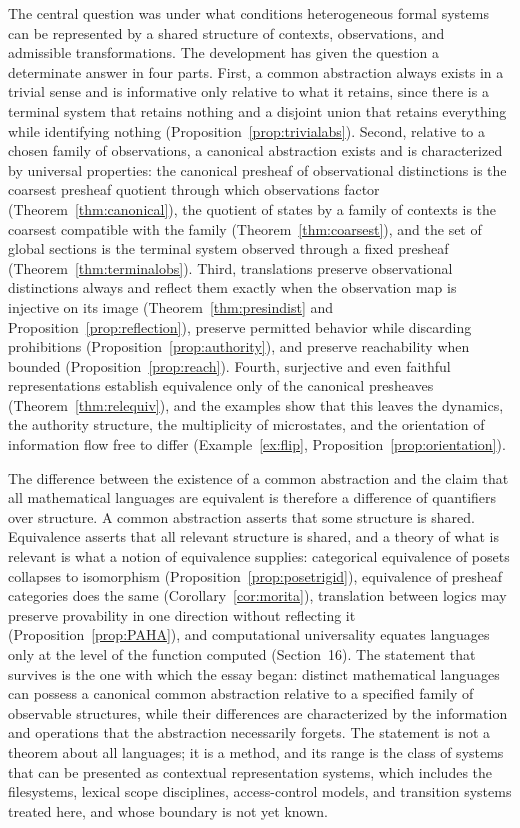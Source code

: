 \documentclass[11pt]{article}
\theoremstyle{definition}
\theoremstyle{remark}
\begin{document}
The central question was under what conditions heterogeneous formal systems can be represented by a shared structure of contexts, observations, and admissible transformations. The development has given the question a determinate answer in four parts. First, a common abstraction always exists in a trivial sense and is informative only relative to what it retains, since there is a terminal system that retains nothing and a disjoint union that retains everything while identifying nothing (Proposition~\ref{prop:trivialabs}). Second, relative to a chosen family of observations, a canonical abstraction exists and is characterized by universal properties: the canonical presheaf of observational distinctions is the coarsest presheaf quotient through which observations factor (Theorem~\ref{thm:canonical}), the quotient of states by a family of contexts is the coarsest compatible with the family (Theorem~\ref{thm:coarsest}), and the set of global sections is the terminal system observed through a fixed presheaf (Theorem~\ref{thm:terminalobs}). Third, translations preserve observational distinctions always and reflect them exactly when the observation map is injective on its image (Theorem~\ref{thm:presindist} and Proposition~\ref{prop:reflection}), preserve permitted behavior while discarding prohibitions (Proposition~\ref{prop:authority}), and preserve reachability when bounded (Proposition~\ref{prop:reach}). Fourth, surjective and even faithful representations establish equivalence only of the canonical presheaves (Theorem~\ref{thm:relequiv}), and the examples show that this leaves the dynamics, the authority structure, the multiplicity of microstates, and the orientation of information flow free to differ (Example~\ref{ex:flip}, Proposition~\ref{prop:orientation}).

The difference between the existence of a common abstraction and the claim that all mathematical languages are equivalent is therefore a difference of quantifiers over structure. A common abstraction asserts that some structure is shared. Equivalence asserts that all relevant structure is shared, and a theory of what is relevant is what a notion of equivalence supplies: categorical equivalence of posets collapses to isomorphism (Proposition~\ref{prop:posetrigid}), equivalence of presheaf categories does the same (Corollary~\ref{cor:morita}), translation between logics may preserve provability in one direction without reflecting it (Proposition~\ref{prop:PAHA}), and computational universality equates languages only at the level of the function computed (Section~16). The statement that survives is the one with which the essay began: distinct mathematical languages can possess a canonical common abstraction relative to a specified family of observable structures, while their differences are characterized by the information and operations that the abstraction necessarily forgets. The statement is not a theorem about all languages; it is a method, and its range is the class of systems that can be presented as contextual representation systems, which includes the filesystems, lexical scope disciplines, access-control models, and transition systems treated here, and whose boundary is not yet known.
\end{document}
